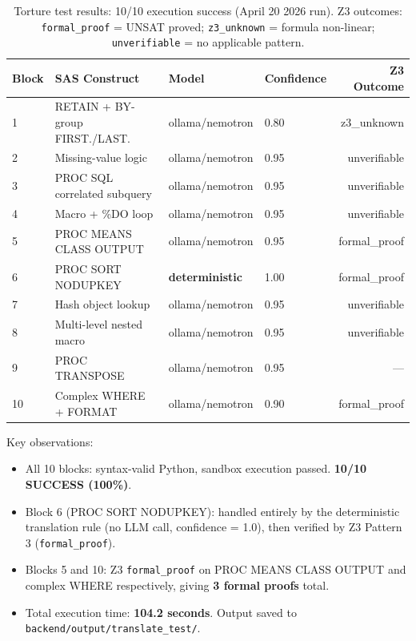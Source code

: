 \begin{table}[ht]
\centering
\caption{Torture test results: 10/10 execution success (April 20 2026 run).
Z3 outcomes: \texttt{formal\_proof} = UNSAT proved; \texttt{z3\_unknown} = formula
non-linear; \texttt{unverifiable} = no applicable pattern.}
\label{tab:torture-test}
\small
\begin{tabular}{@{}llllr@{}}
\toprule
Block & SAS Construct & Model & Confidence & Z3 Outcome \\
\midrule
1 & RETAIN + BY-group FIRST./LAST. & ollama/nemotron & 0.80 & z3\_unknown \\
2 & Missing-value logic & ollama/nemotron & 0.95 & unverifiable \\
3 & PROC SQL correlated subquery & ollama/nemotron & 0.95 & unverifiable \\
4 & Macro + \%DO loop & ollama/nemotron & 0.95 & unverifiable \\
5 & PROC MEANS CLASS OUTPUT & ollama/nemotron & 0.95 & formal\_proof \\
6 & PROC SORT NODUPKEY & \textbf{deterministic} & 1.00 & formal\_proof \\
7 & Hash object lookup & ollama/nemotron & 0.95 & unverifiable \\
8 & Multi-level nested macro & ollama/nemotron & 0.95 & unverifiable \\
9 & PROC TRANSPOSE & ollama/nemotron & 0.95 & --- \\
10 & Complex WHERE + FORMAT & ollama/nemotron & 0.90 & formal\_proof \\
\bottomrule
\end{tabular}
\end{table}

Key observations:
\begin{itemize}
  \item All 10 blocks: syntax-valid Python, sandbox execution passed.
    \textbf{10/10 SUCCESS (100\%)}.
  \item Block 6 (PROC SORT NODUPKEY): handled entirely by the deterministic
    translation rule (no LLM call, confidence = 1.0), then verified by Z3
    Pattern 3 (\texttt{formal\_proof}).
  \item Blocks 5 and 10: Z3 \texttt{formal\_proof} on PROC MEANS CLASS OUTPUT
    and complex WHERE respectively, giving \textbf{3 formal proofs} total.
  \item Total execution time: \textbf{104.2 seconds}. Output saved to
    \texttt{backend/output/translate\_test/}.
\end{itemize}

